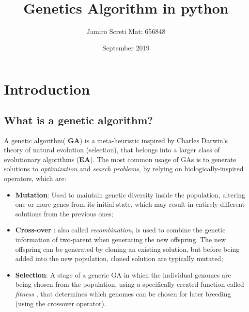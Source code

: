 \documentclass{article}
\title{Genetics Algorithm in python}
\author{Jamiro Screti   Mat: 656848 }
\date{September 2019}
\begin{document}
\maketitle

\tableofcontents
\section{Introduction}
\subsection{What is a genetic algorithm?}
A genetic algorithm( \textbf{GA}) is a meta-heuristic inspired by Charles Darwin's theory of natural evolution (selection), that belongs into a larger class of evolutionary algorithms (\textbf{EA}). \newline
The most common usage of GAs is to generate solutions to \textit{optimization} and \textit{search problems}, by relying on biologically-inspired operators, which are:
\begin{itemize}
  \item \textbf{Mutation}: Used to maintain genetic diversity inside the population, altering one or more genes from its initial state, which may result in entirely different solutions from the previous ones;
  \item \textbf{Cross-over} : also called \textit{recombination}, is used to combine the genetic information of two-parent when generating the new offspring. The new offspring can be generated by cloning an existing solution, but before being added into the new population, cloned solution are typically mutated;
  \item \textbf{Selection}: A stage of a generic GA in which the individual genomes are being chosen from the population, using a specifically created function called \textit{fitness }, that determines which genomes can be chosen for later breeding (using the crossover operator).
\end{itemize}
\end{document}
